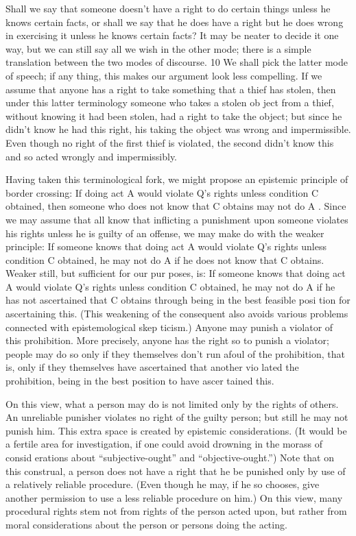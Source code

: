 \documentclass[11pt,openany]{book}
\begin{document}
Shall we say that someone doesn't have a right to do certain things unless he knows certain facts, or shall we say that he does have a right but he does wrong in exercising it unless he knows certain facts? It may be neater to decide it one way, but we can still say all we wish in the other mode; there is a simple translation between the two modes of discourse. 10 We shall pick the latter mode of speech; if any thing, this makes our argument look less compelling. If we assume that anyone has a right to take something that a thief has stolen, then under this latter terminology someone who takes a stolen ob ject from a thief, without knowing it had been stolen, had a right to take the object; but since he didn't know he had this right, his taking the object was wrong and impermissible. Even though no right of the first thief is violated, the second didn't know this and so acted wrongly and impermissibly. 

Having taken this terminological fork, we might propose an epistemic principle of border crossing: If doing act A would violate Q's rights unless condition C obtained, then someone who does not know that C obtains may not do A . Since we may assume that all know that inflicting a punishment upon someone violates his rights unless he is guilty of an offense, we may make do with the weaker principle: If someone knows that doing act A would violate Q's rights unless condition C obtained, he may not do A if he does not know that C obtains. Weaker still, but sufficient for our pur poses, is: If someone knows that doing act A would violate Q's rights unless condition C obtained, he may not do A if he has not ascertained that C obtains through being in the best feasible posi tion for ascertaining this. (This weakening of the consequent also avoids various problems connected with epistemological skep ticism.) Anyone may punish a violator of this prohibition. More precisely, anyone has the right so to punish a violator; people may do so only if they themselves don't run afoul of the prohibition, that is, only if they themselves have ascertained that another vio lated the prohibition, being in the best position to have ascer tained this. 

On this view, what a person may do is not limited only by the rights of others. An unreliable punisher violates no right of the guilty person; but still he may not punish him. This extra space is created by epistemic considerations. (It would be a fertile area for investigation, if one could avoid drowning in the morass of consid erations about ``subjective-ought'' and ``objective-ought.'') Note that on this construal, a person does not have a right that he be punished only by use of a relatively reliable procedure. (Even though he may, if he so chooses, give another permission to use a less reliable procedure on him.) On this view, many procedural rights stem not from rights of the person acted upon, but rather from moral considerations about the person or persons doing the acting. 
\end{document}
